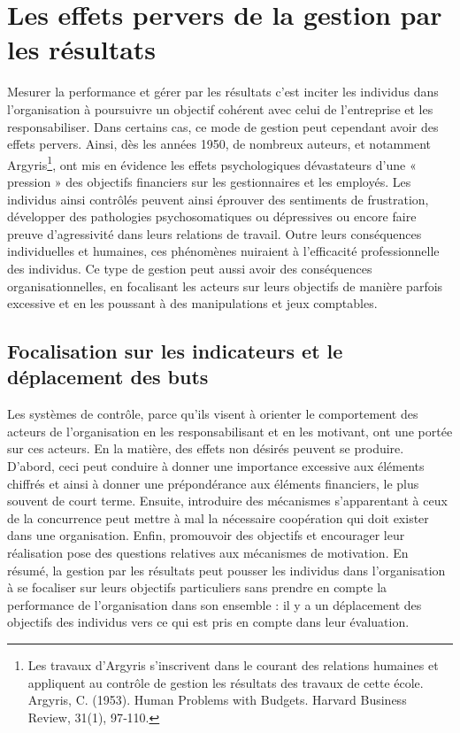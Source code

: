 \documentclass[oneside]{kaobook}
\begin{document}
\section{Les effets pervers de la gestion par les résultats}
\label{sec:org4ed4c58}
Mesurer la performance et gérer par les résultats c’est inciter les individus dans l’organisation à poursuivre un objectif cohérent avec celui de l’entreprise et les responsabiliser. Dans certains cas, ce mode de gestion peut cependant avoir des effets pervers. Ainsi, dès les années 1950, de nombreux auteurs, et notamment Argyris\footnote{Les travaux d’Argyris s’inscrivent dans le courant des relations humaines et appliquent au contrôle de gestion les résultats des travaux de cette école. Argyris, C. (1953). Human Problems with Budgets. Harvard Business Review, 31(1), 97‑110.}, ont mis en évidence les effets psychologiques dévastateurs d’une « pression » des objectifs financiers sur les gestionnaires et les employés. Les individus ainsi contrôlés peuvent ainsi éprouver des sentiments de frustration, développer des pathologies psychosomatiques ou dépressives ou encore faire preuve d’agressivité dans leurs relations de travail. Outre leurs conséquences individuelles et humaines, ces phénomènes nuiraient à l’efficacité professionnelle des individus. Ce type de gestion peut aussi avoir des conséquences organisationnelles, en focalisant les acteurs sur leurs objectifs de manière parfois excessive et en les poussant à des manipulations et jeux comptables.
\subsection{Focalisation sur les indicateurs et le déplacement des buts}
\label{sec:org3d6ff2e}
Les systèmes de contrôle, parce qu’ils visent à orienter le comportement des acteurs de l’organisation en les responsabilisant et en les motivant, ont une portée sur ces acteurs. En la matière, des effets non désirés peuvent se produire. D’abord, ceci peut conduire à donner une importance excessive aux éléments chiffrés et ainsi à donner une prépondérance aux éléments financiers, le plus souvent de court terme. Ensuite, introduire des mécanismes s’apparentant à ceux de la concurrence peut mettre à mal la nécessaire coopération qui doit exister dans une organisation. Enfin, promouvoir des objectifs et encourager leur réalisation pose des questions relatives aux mécanismes de motivation. En résumé, la gestion par les résultats peut pousser les individus dans l’organisation à se focaliser sur leurs objectifs particuliers sans prendre en compte la performance de l’organisation dans son ensemble : il y a un déplacement des objectifs des individus vers ce qui est pris en compte dans leur évaluation.
\end{document}
